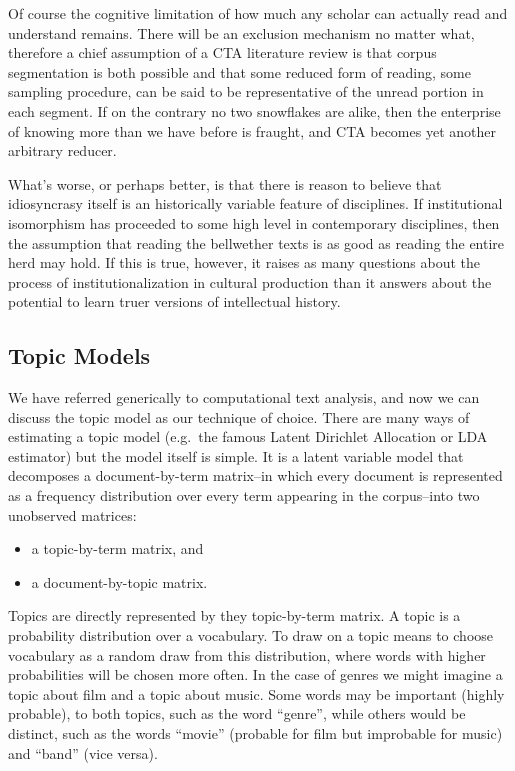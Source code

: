 \documentclass[]{book}
\providecommand{\tightlist}{%
  \setlength{\itemsep}{0pt}\setlength{\parskip}{0pt}}
\theoremstyle{definition}
\theoremstyle{definition}
\theoremstyle{definition}
\theoremstyle{remark}
\begin{document}
Of course the cognitive limitation of how much any scholar can actually
read and understand remains. There will be an exclusion mechanism no
matter what, therefore a chief assumption of a CTA literature review is
that corpus segmentation is both possible and that some reduced form of
reading, some sampling procedure, can be said to be representative of
the unread portion in each segment. If on the contrary no two snowflakes
are alike, then the enterprise of knowing more than we have before is
fraught, and CTA becomes yet another arbitrary reducer.

What's worse, or perhaps better, is that there is reason to believe that
idiosyncrasy itself is an historically variable feature of disciplines.
If institutional isomorphism has proceeded to some high level in
contemporary disciplines, then the assumption that reading the
bellwether texts is as good as reading the entire herd may hold. If this
is true, however, it raises as many questions about the process of
institutionalization in cultural production than it answers about the
potential to learn truer versions of intellectual history.

\hypertarget{topic-models}{%
\subsection{Topic Models}\label{topic-models}}

We have referred generically to computational text analysis, and now we
can discuss the topic model as our technique of choice. There are many
ways of estimating a topic model (e.g.~the famous Latent Dirichlet
Allocation or LDA estimator) but the model itself is simple. It is a
latent variable model that decomposes a document-by-term matrix--in
which every document is represented as a frequency distribution over
every term appearing in the corpus--into two unobserved matrices:

\begin{itemize}
\tightlist
\item
  a topic-by-term matrix, and
\item
  a document-by-topic matrix.
\end{itemize}

Topics are directly represented by they topic-by-term matrix. A topic is
a probability distribution over a vocabulary. To draw on a topic means
to choose vocabulary as a random draw from this distribution, where
words with higher probabilities will be chosen more often. In the case
of genres we might imagine a topic about film and a topic about music.
Some words may be important (highly probable), to both topics, such as
the word ``genre'', while others would be distinct, such as the words
``movie'' (probable for film but improbable for music) and ``band''
(vice versa).
\end{document}
